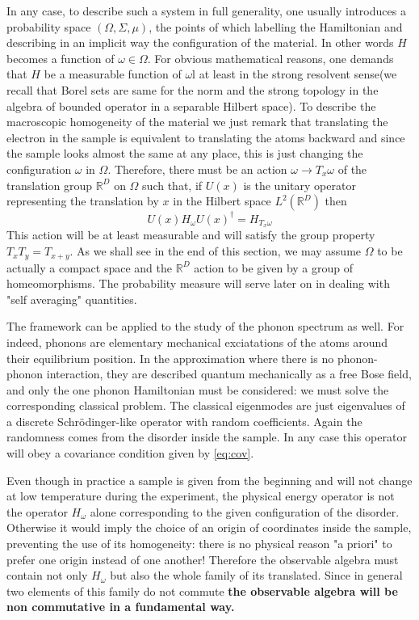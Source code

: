 In any case, to describe such a system in full generality, one usually introduces a probability space $(\Omega, \Sigma, \mu)$, the points of which labelling the Hamiltonian and describing in an implicit way the configuration of the material. In other words $H$ becomes a function of $\omega\in \Omega$. For obvious mathematical reasons, one demands that $H$ be a measurable function of $\omega$l at least in the strong resolvent sense(we recall that Borel sets are same for the norm and the strong topology in the algebra of bounded operator in a separable Hilbert space). To describe the macroscopic homogeneity of the material we just remark that translating the electron in the sample is equivalent to translating the atoms backward and since the sample looks almost the same at any place, this is just changing the configuration $\omega$ in $\Omega$. Therefore, there must be an action $\omega\rightarrow T_x\omega$ of the translation group $\mathbb{R}^D$ on $\Omega$ such that, if $U(x)$ is the unitary operator representing the translation by $x$ in the Hilbert space $L^2(\mathbb{R}^D)$ then
\begin{equation}
U(x)H_\omega U(x)^\dagger = H_{T_x\omega}
\label{eq:cov}
\end{equation}
This action will be at least measurable and will satisfy the group property $T_{x}T_y=T_{x+y}$. As we shall see in the end of this section, we may assume $\Omega$ to be actually a compact space and the $\mathbb{R}^D$ action to be given by a group of homeomorphisms. The probability measure will serve later on in dealing with "self averaging" quantities.

The framework can be applied to the study of the phonon spectrum as well. For indeed, phonons are elementary mechanical exciatations of the atoms around their equilibrium position. In the approximation where there is no phonon-phonon interaction, they are described quantum mechanically as a free Bose field, and only the one phonon Hamiltonian must be considered: we must solve the corresponding classical problem. The classical eigenmodes are just eigenvalues of a discrete Schr{\"o}dinger-like operator with random coefficients. Again the randomness comes from the disorder inside the sample. In any case this operator will obey a covariance condition given by \ref{eq:cov}.

Even though in practice a sample is given from the beginning and will not change at low temperature during the experiment, the physical energy operator is not the operator $H_\omega$ alone corresponding to the given configuration of the disorder. Otherwise it would imply the choice of an origin of coordinates inside the sample, preventing the use of its homogeneity: there is no physical reason "a priori" to prefer one origin instead of one another! Therefore the observable algebra must contain not only $H_\omega$ but also the whole family of its translated. Since in general two elements of this family do not commute \textbf{the observable algebra will be non commutative in a fundamental way.}

